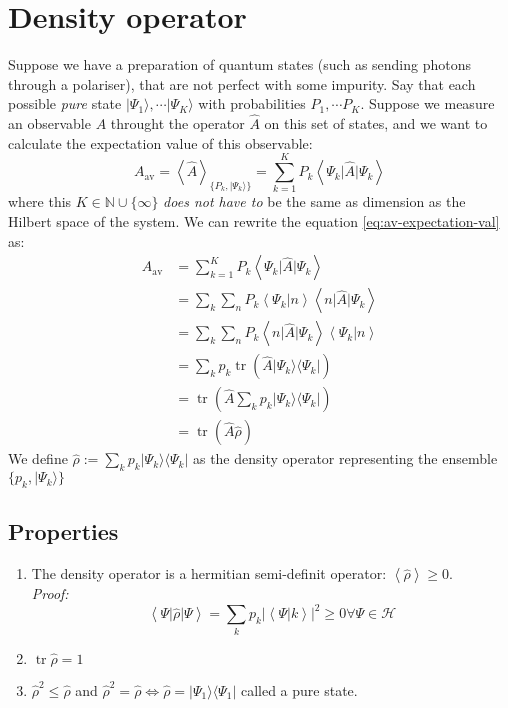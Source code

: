 \documentclass[12pt]{book}
\theoremstyle{definition}
\newcommand{\N}{\mathbb N}
\newcommand{\scalar}[1]{\left\langle {#1}\right\rangle}
\newcommand{\abs}[1]{\left\vert {#1}\right\vert}
\let\oldsum\sum
\renewcommand{\sum}[2]{\oldsum\limits_{#1}^{#2}}
\newcommand{\para}[1]{\left( {#1} \right)}
\newcommand{\bra}[1]{\langle {#1} \vert}
\newcommand{\ket}[1]{\vert {#1} \rangle}
\DeclareMathOperator{\tr}{tr}
\begin{document}
\section{Density operator}
Suppose we have a preparation of quantum states (such as sending photons through a polariser), that are not perfect with some impurity. Say that each possible \emph{pure} state $\ket{\Psi_1}, \cdots \ket{\Psi_K}$ with probabilities $P_1, \cdots P_K$. Suppose we measure an observable $A$ throught the operator $\hat A$ on this set of states, and we want to calculate the expectation value of this observable:
\begin{equation}
  A_{\textrm{av}} = \scalar{\hat A}_{\{P_k, \ket{\Psi_k}\}} = \sum{k=1}{K} P_k \scalar{\Psi_k \vert \hat A \vert \Psi_k} \label{eq:av-expectation-val}
\end{equation}
where this $K \in \N \cup \{\infty\}$ \emph{does not have to} be the same as dimension as the Hilbert space of the system. We can rewrite the equation \ref{eq:av-expectation-val} as:
\begin{align*}
 A_{\textrm{av}} & = \sum{k=1}{K} P_k \scalar{\Psi_k \vert \hat A \vert \Psi_k} \\
 & = \oldsum_k \oldsum_n P_k \scalar{\Psi_k \vert n} \scalar{n \vert \hat A \vert \Psi_k} \\
 & = \oldsum_k \oldsum_n P_k \scalar{n \vert \hat A \vert \Psi_k} \scalar{\Psi_k \vert n} \\
 & = \oldsum_k p_k \tr(\hat A \ket{\Psi_k} \bra{\Psi_k}) \\
 & = \tr\para{\hat A \oldsum_k p_k \ket{\Psi_k} \bra{\Psi_k}} \\
 & = \tr(\hat A \hat \rho)
\end{align*}
We define $\hat \rho := \oldsum_k p_k \ket{\Psi_k} \bra{\Psi_k}$ as the density operator representing the ensemble $\{p_k, \ket{\Psi_k}\}$

\subsection{Properties}
\begin{enumerate}[label = \alph*)]
  \item The density operator is a hermitian semi-definit operator: $\scalar{\hat \rho} \geq 0$. \\
  \emph{Proof:}
  \begin{equation*}
    \scalar{\Psi \vert \hat \rho \vert \Psi} = \oldsum_k p_k \abs{\scalar{\Psi \vert k}}^2 \geq 0 \forall \Psi \in \mathcal H
  \end{equation*}
  \item $\tr \hat \rho = 1$
  \item $\hat{\rho}^2 \leq \hat \rho$ and $\hat \rho^2 = \hat \rho \iff \hat \rho = \ket{\Psi_1}\bra{\Psi_1}$ called a pure state.
\end{enumerate}
\end{document}
